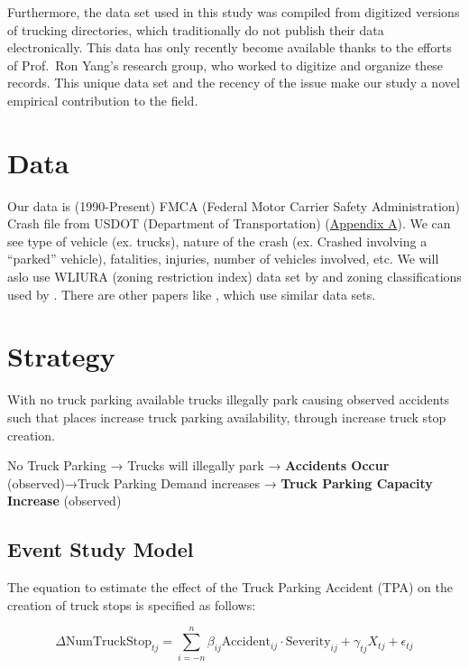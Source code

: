 \documentclass[
  12pt]{article}
\begin{document}
Furthermore, the data set used in this study was compiled from digitized
versions of trucking directories, which traditionally do not publish
their data electronically. This data has only recently become available
thanks to the efforts of Prof.~Ron Yang's research group, who worked to
digitize and organize these records. This unique data set and the
recency of the issue make our study a novel empirical contribution to
the field.

\section{Data}\label{data}

Our data is (1990-Present) FMCA (Federal Motor Carrier Safety
Administration) Crash file from USDOT (Department of Transportation)
(\label{sec:appendix-a}\hyperref[sec-a.-visualization-of-dataset.-]{Appendix
A}). We can see type of vehicle (ex. trucks), nature of the crash (ex.
Crashed involving a ``parked'' vehicle), fatalities, injuries, number of
vehicles involved, etc. We will aslo use WLIURA (zoning restriction
index) data set by \citet{gyourkoNewMeasureLocal2008} and zoning
classifications used by \citet{puentesTraditionalReformedReview2006} .
There are other papers like \citet{liangSafetyInspectionsImprove2021},
which use similar data sets.

\section{\texorpdfstring{\textbf{Strategy}}{Strategy}}\label{strategy}

With no truck parking available trucks illegally park causing observed
accidents such that places increase truck parking availability, through
increase truck stop creation.

No Truck Parking → Trucks will illegally park → \textbf{Accidents Occur}
(observed)→Truck Parking Demand increases → \textbf{Truck Parking
Capacity Increase} (observed)

\subsection{Event Study Model}\label{event-study-model}

The equation to estimate the effect of the Truck Parking Accident (TPA)
on the creation of truck stops is specified as follows:

\[
\Delta \text{NumTruckStop}_{tj} = \sum_{i=-n}^{n} \beta_{ij} \text{Accident}_{ij}\cdot \text{Severity}_{ij} + \gamma_{tj} X_{tj} + \epsilon_{tj}
\]
\end{document}
